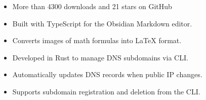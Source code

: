 \smallskip
\begin{itemize}
\item More than 4300 downloads and 21 stars on GitHub
\item Built with TypeScript for the Obsidian Markdown editor.
\item Converts images of math formulas into LaTeX format.
\end{itemize}
\smallskip
\smallskip
{}
\smallskip
\begin{itemize}
\item Developed in Rust to manage DNS subdomains via CLI.
\item Automatically updates DNS records when public IP changes.
\item Supports subdomain registration and deletion from the CLI.
\end{itemize}
